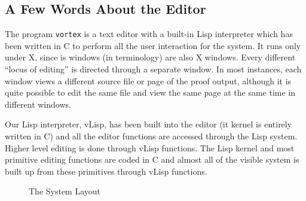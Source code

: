 \subsection{A Few Words About the Editor}

The program {\tt vortex} is a text editor with a built-in Lisp interpreter
which has been written in C to perform all the user interaction for the
{\VorTeX} system.  It runs only under X, since is windows (in {\EMACS}
terminology) are also X windows.  Every different ``locus of editing''
is directed through a separate window.  In most instances, each window
views a different source file or page of the proof output, although it
is quite possible to edit the same file and view the same page at the
same time in different windows.

Our Lisp interpreter, vLisp, has been built into the editor (it kernel is
entirely written in C) and all the editor functions are accessed through
the Lisp system.  Higher level editing is done through vLisp functions.
The Lisp kernel and most primitive editing functions are coded in C and
almost all of the visible system is built up from these primitives through
vLisp functions.

\begin{figure}
    \centerline{}
    \caption{The {\VorTeX} System Layout}
\end{figure}
